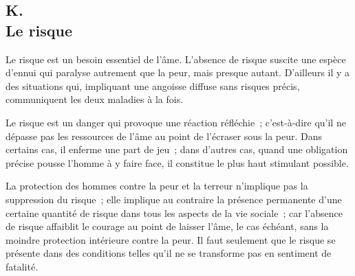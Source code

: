 \documentclass[french,twoside]{book} %
\begin{document}
\subsection[K. Le risque]{K. \\
Le risque}
\noindent \par
Le risque est un besoin essentiel de l'âme. L'absence de risque suscite une espèce d'ennui qui paralyse autrement que la peur, mais presque autant. D'ailleurs il y a des situations qui, impliquant une angoisse diffuse sans risques précis, communiquent les deux maladies à la fois.\par
Le risque est un danger qui provoque une réaction réfléchie ; c'est-à-dire qu'il ne dépasse pas les ressources de l'âme au point de l'écraser sous la peur. Dans certains cas, il enferme une part de jeu ; dans d'autres cas, quand une obligation précise pousse l'homme à y faire face, il constitue le plus haut stimulant possible.\par
La protection des hommes contre la peur et la terreur n'implique pas la suppression du risque ; elle implique au contraire la présence permanente d'une certaine quantité de risque dans tous les aspects de la vie sociale ; car l'absence de risque affaiblit le courage au point de laisser l'âme, le cas échéant, sans la moindre protection intérieure contre la peur. Il faut seulement que le risque se présente dans des conditions telles qu'il ne se transforme pas en sentiment de fatalité.
\end{document}
